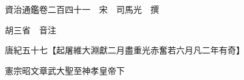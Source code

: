 










 


 
 


 

  
  
  
  
  





  
  
  
  
  
 
  

  

  
  
  



  

 
 

  
   




  

  
  


  　　資治通鑑卷二百四十一　宋　司馬光　撰

　　胡三省　音注

　　唐紀五十七【起屠維大淵獻二月盡重光赤奮若六月凡二年有奇】

　　憲宗昭文章武大聖至神孝皇帝下

